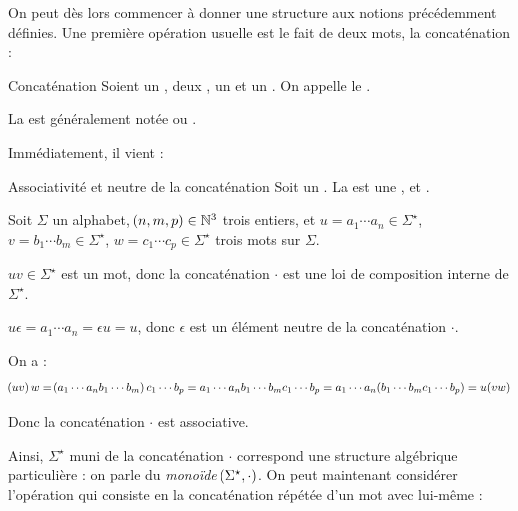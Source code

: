 \documentclass[a4paper,french,bookmarks]{book}
\begin{document}
    On peut dès lors commencer à donner une structure aux notions précédemment définies. Une première opération usuelle est le fait de  deux mots, \ie la concaténation :
    
    \begin{definition}{Concaténation}{}
        Soient \hg{$\Sigma$} un ,  deux ,  un  et  un . On appelle  le . 
    \end{definition}{}{}
    
    \begin{notation}
        La  est généralement notée  ou .
    \end{notation}
    
    Immédiatement, il vient :
    \begin{property}{Associativité et neutre de la concaténation}{}
        Soit \hg{$\Sigma$} un . La  est une ,  et .
    \end{property}
    \begin{nproof}
        Soit $\Sigma$ un alphabet, $\!\left(n, m, p\right) \in \mathbb{N}^3$ trois entiers, et $u = a_1\cdots a_n \in \Sigma^\star$, $v = b_1\cdots b_m \in \Sigma^\star$, $w = c_1\cdots c_p \in \Sigma^\star$ trois mots sur $\Sigma$.
        \begin{enumerate}
            \itt $uv \in \Sigma^\star$ est un mot, donc la concaténation $\cdot$ est une loi de composition interne de $\Sigma^\star$.
            
            \itt $u\epsilon = a_1\cdots a_n = \epsilon u = u$, donc $\epsilon$ est un élément neutre de la concaténation $\cdot$.
            
            \itt On a :
            \[ \!\left(uv\right)w = \!\left(a_1\cdots a_nb_1\cdots b_m\right)c_1 \cdots b_p = a_1\cdots a_nb_1\cdots b_mc_1\cdots b_p = a_1 \cdots a_n\!\left(b_1 \cdots b_mc_1 \cdots b_p\right) = u\!\left(vw\right)\]
        \end{enumerate}
        \qquad\quad Donc la concaténation $\cdot$ est associative.
    \end{nproof}
    
    Ainsi, $\Sigma^\star$ muni de la concaténation $\cdot$ correspond une structure algébrique particulière : on parle du \textit{monoïde} $\!\left(\Sigma^\star, \cdot\right)$.
    On peut maintenant considérer l'opération qui consiste en la concaténation répétée d'un mot avec lui-même :
    
\end{document}

